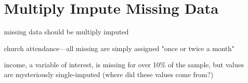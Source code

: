 
\section{Multiply Impute Missing Data}

missing data should be multiply imputed \citep[e.g.,][]{King2001}

church attendance---all missing are simply assigned "once or twice a month"

income, a variable of interest, is missing for over 10\% of the sample, but values are mysteriously single-imputed (where did these values come from?)
